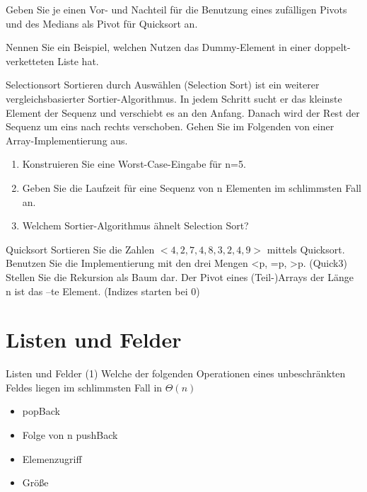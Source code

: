 \documentclass[18pt]{beamer}
\begin{document}
\begin{frame}
 Geben Sie je einen Vor- und Nachteil für die Benutzung eines zufälligen Pivots und des Medians als Pivot für Quicksort an.
\end{frame}

\begin{frame}
 Nennen Sie ein Beispiel, welchen Nutzen das Dummy-Element in einer doppelt-verketteten Liste hat.
\end{frame}

\begin{frame}{Selectionsort}
 Sortieren durch Auswählen (Selection Sort) ist ein weiterer vergleichsbasierter Sortier-Algorithmus. In jedem Schritt sucht er das kleinste Element der Sequenz und verschiebt es an den Anfang. Danach wird der Rest der Sequenz um eins nach rechts verschoben. Gehen Sie im Folgenden von einer Array-Implementierung aus.
 \begin{enumerate}[label=\alph* )]
  \item Konstruieren Sie eine Worst-Case-Eingabe für n=5.
  \item Geben Sie die Laufzeit für eine Sequenz von n Elementen im schlimmsten Fall an.
  \item Welchem Sortier-Algorithmus ähnelt Selection Sort?
 \end{enumerate}
\end{frame}

\begin{frame}{Quicksort}
Sortieren Sie die Zahlen $<4,2,7,4,8,3,2,4,9>$ mittels Quicksort. 
Benutzen Sie die Implementierung mit den drei Mengen <p, =p, >p. (Quick3) 
Stellen Sie die Rekursion als Baum dar. Der Pivot eines 
(Teil-)Arrays der Länge n ist das –te Element. (Indizes starten bei 0)
\end{frame}


\section{Listen und Felder}
\begin{frame}{Listen und Felder (1)}
 Welche der folgenden Operationen eines unbeschränkten Feldes 
 liegen im schlimmsten Fall in $\Theta(n)$
 \begin{itemize}
  \item popBack
  \item Folge von n pushBack
  \item Elemenzugriff
  \item Größe
 \end{itemize}
\end{frame}
\end{document}
